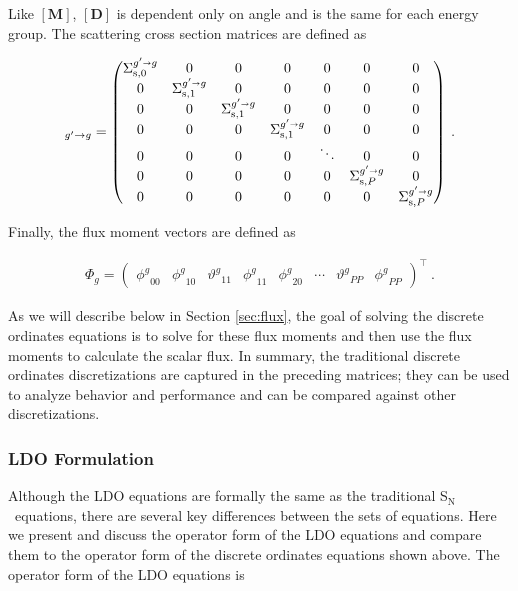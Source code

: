 \documentclass{article} %
\newcommand{\sa}{\shortrightarrow}
\newcommand{\sn}{S$_\mathrm{N}$}
\newcommand{\ve}[1]{\ensuremath{\mathbf{#1}}}
\newcommand{\Sigg}[1]{\ensuremath{\Sigma^{g'\sa g}_{\text{s},#1}}}
\newcommand{\even}{\ensuremath{\phi^g}}
\newcommand{\odd}{\ensuremath{\vartheta^g}}
\begin{document}
\noindent Like $[\ve{M}]$, $[\ve{D}]$ is dependent only on angle and is the
same for each energy group. The scattering cross section matrices are defined
as

\begin{equation}
  [\ve{S}]_{g'\rightarrow g} = \begin{pmatrix}
    \Sigg{0} & 0 & 0 & 0 & 0 & 0 & 0 \\
    0 & \Sigg{1} & 0 & 0 & 0 & 0 & 0 \\
    0 & 0 & \Sigg{1} & 0 & 0 & 0 & 0 \\
    0 & 0 & 0 & \Sigg{1} & 0 & 0 & 0 \\
    0 & 0 & 0 & 0 & \ddots   & 0 & 0 \\
    0 & 0 & 0 & 0 & 0 & \Sigg{P} & 0 \\
    0 & 0 & 0 & 0 & 0 & 0 & \Sigg{P}
  \end{pmatrix}\:.
\label{denovo_scatter}
\end{equation}

\noindent Finally, the flux moment vectors are defined as

\begin{align}
  \Phi_g = \begin{pmatrix}
    \even_{00} & \even_{10} & \odd_{11} & \even_{11} & \even_{20}
    & \cdots & \odd_{PP} & \even_{PP}
  \end{pmatrix}^\top\:.
\end{align}

\noindent As we will describe below in Section \ref{sec:flux}, the 
goal of solving the discrete ordinates equations is to solve for these flux
moments and then use the flux moments to calculate the scalar flux. In summary,
the traditional discrete ordinates discretizations are captured in the
preceding matrices; they can be used to analyze behavior and performance and
can be compared against other discretizations.

\subsubsection{LDO Formulation}

Although the LDO equations are formally the same as the traditional \sn\
equations, there are several key differences between the sets of equations.
Here we present and discuss the operator form of the LDO equations and
compare them to the operator form of the discrete ordinates
equations shown above. The operator form of the LDO equations is
\end{document}

